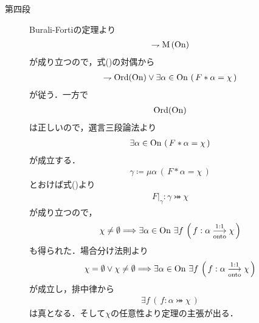\begin{prf}
\begin{description}
			\item[第四段]
				Burali-Fortiの定理より
				\begin{align}
					\rightharpoondown \operatorname*{M}\left(\mathrm{On}\right)
				\end{align}
				が成り立つので，式()の対偶から
				\begin{align}
					\rightharpoondown \operatorname*{Ord}(\mathrm{On}) \vee 
					\exists \alpha \in \mathrm{On}\, \left(\, F \ast \alpha = \chi\, \right)
				\end{align}
				が従う．一方で
				\begin{align}
					\operatorname*{Ord}(\mathrm{On})
				\end{align}
				は正しいので，選言三段論法より
				\begin{align}
					\exists \alpha \in \mathrm{On}\, \left(\, F \ast \alpha = \chi\, \right)
				\end{align}
				が成立する．
				\begin{align}
					\gamma \coloneqq \mu \alpha \, \left(\, F \ast \alpha = \chi\, \right)
				\end{align}
				とおけば式()より
				\begin{align}
					F|_\gamma:\gamma \bij \chi
				\end{align}
				が成り立つので，
				\begin{align}
					\chi \neq \emptyset \Longrightarrow \exists \alpha \in \ON\ 
					\exists f\, \left(\, f:\alpha \bij \chi\, \right)
				\end{align}
				も得られた．場合分け法則より
				\begin{align}
					\chi = \emptyset \vee \chi \neq \emptyset \Longrightarrow \exists \alpha \in \ON\ 
					\exists f\, \left(\, f:\alpha \bij \chi\, \right)
				\end{align}
				が成立し，排中律から
				\begin{align}
					\exists f\, \left(\, f:\alpha \bij \chi\, \right)
				\end{align}
				は真となる．そして$\chi$の任意性より定理の主張が出る．
				\QED
		\end{description}
	\end{prf}